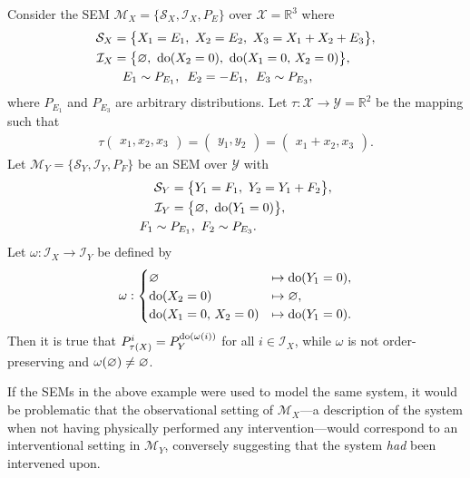 \begin{example}\label{example:wrong1}
Consider the SEM $\mathcal{M}_X=\{\mathcal{S}_X , \mathcal{I}_X, P_E\}$ over $\mathcal{X}=\mathbb{R}^3$ where
%
\begin{align*}
\mathcal{S}_X = \big\{ & X_1 = E_1,\ X_2 = E_2,\ X_3 = X_1 + X_2 + E_3 \big\}, \\
%
\mathcal{I}_X = \big\{ & \nulli,\ \doop(X_2=0),\ \doop(X_1=0,\, X_2=0)\big\}, \\
%
E_1 & \sim P_{E_1},\ \,  E_2 = - E_1, \  \, E_3 \sim P_{E_3},
\end{align*}
%
where $P_{E_1}$ and $P_{E_3}$ are arbitrary distributions.
Let ${\tau:\mathcal{X}\to\mathcal{Y}=\mathbb{R}^2}$ be the mapping such that
\begin{align*}
\tau\begin{pmatrix} x_1, x_2, x_3 \end{pmatrix}
= \begin{pmatrix} y_1, y_2\end{pmatrix}
= \begin{pmatrix} x_1 + x_2, x_3\end{pmatrix}.
\end{align*}
%
Let $\mathcal{M}_Y =\{\mathcal{S}_Y , \mathcal{I}_Y, P_F\}$ be an SEM over $\mathcal{Y}$ with
%
\begin{align*}
\mathcal{S}_Y = \big\{ & Y_1 = F_1,\ Y_2 = Y_1 + F_2 \big\}, \\
%
\mathcal{I}_Y = \big\{ & \nulli,\ \doop(Y_1=0) \big\}, \\
%
F_1 \sim P_{E_1},&  \  \, F_2 \sim P_{E_3}.
\end{align*}
%
Let ${\omega:\mathcal{I}_X \to \mathcal{I}_Y}$ be defined by
%
\begin{align*}
\omega: \begin{cases}
\varnothing &\mapsto \operatorname{do}(Y_1=0), \\
\operatorname{do}(X_2=0) &\mapsto \varnothing, \\
\operatorname{do}(X_1=0,\, X_2=0) &\mapsto \operatorname{do}(Y_1=0). \\
\end{cases}
\end{align*}
%
Then it is true that ${P_{\tau(X)}^{i} = P_Y^{\operatorname{do}(\omega(i))}}$ for all  ${i \in \mathcal{I}_X }$, while $\omega$ is not order-preserving and $\omega(\varnothing)\not = \varnothing$.
\end{example}

If the SEMs in the above example were used to model the same system, it would be problematic that the observational setting of $\mathcal{M}_X$---a description of the system when not having physically performed any intervention---would correspond to an interventional setting in $\mathcal{M}_Y$, conversely suggesting that the system \emph{had} been intervened upon.

